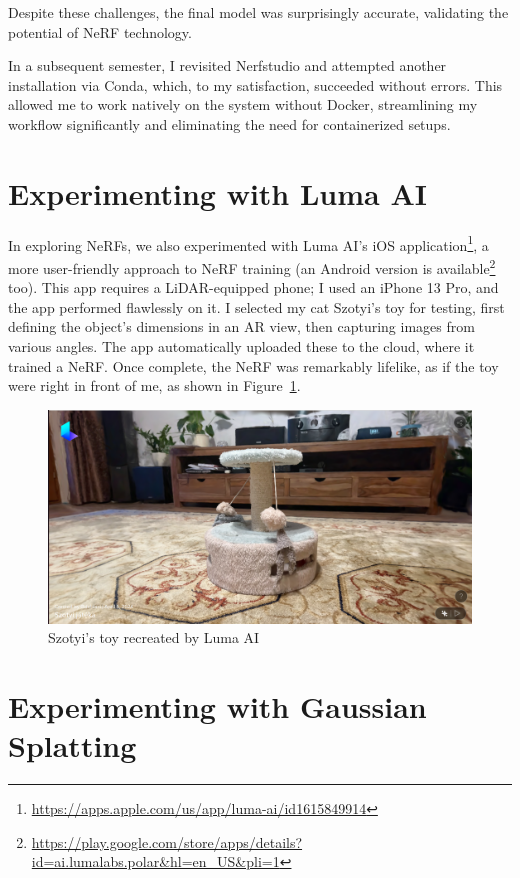Despite these challenges, the final model was surprisingly accurate, validating the potential of NeRF technology. 

In a subsequent semester, I revisited Nerfstudio and attempted another installation via Conda, which, to my satisfaction, succeeded without errors. This allowed me to work natively on the system without Docker, streamlining my workflow significantly and eliminating the need for containerized setups.


\section{Experimenting with Luma AI}

In exploring NeRFs, we also experimented with Luma AI’s iOS application\footnote{\url{https://apps.apple.com/us/app/luma-ai/id1615849914}}, a more user-friendly approach to NeRF training (an Android version is available\footnote{\url{https://play.google.com/store/apps/details?id=ai.lumalabs.polar&hl=en_US&pli=1}} too). This app requires a LiDAR-equipped phone; I used an iPhone 13 Pro, and the app performed flawlessly on it. I selected my cat Szotyi’s toy for testing, first defining the object’s dimensions in an AR view, then capturing images from various angles. The app automatically uploaded these to the cloud, where it trained a NeRF. Once complete, the NeRF was remarkably lifelike, as if the toy were right in front of me, as shown in Figure~\ref{fig:luma_ai_szotyi_toy}.

\begin{figure}[htbp]
	\centering
	\includegraphics[width=150mm, keepaspectratio]{figures/szotyi_jateka_luma_ai.png}
	\caption{Szotyi's toy recreated by Luma AI}
	\label{fig:luma_ai_szotyi_toy}
\end{figure}

\section{Experimenting with Gaussian Splatting}

